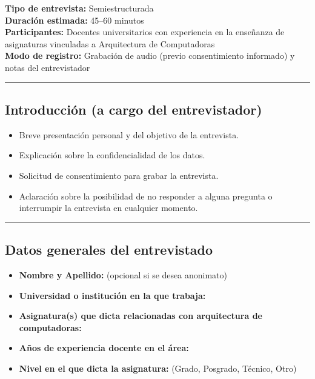 \documentclass[12pt,oneside]{templates/unerthesis}
\providecommand{\tightlist}{%
  \setlength{\itemsep}{0pt}\setlength{\parskip}{0pt}}
\begin{document}
\textbf{Tipo de entrevista:} Semiestructurada\\
\textbf{Duración estimada:} 45--60 minutos\\
\textbf{Participantes:} Docentes universitarios con experiencia en la enseñanza de asignaturas vinculadas a Arquitectura de Computadoras\\
\textbf{Modo de registro:} Grabación de audio (previo consentimiento informado) y notas del entrevistador

\begin{center}\rule{0.5\linewidth}{0.5pt}\end{center}

\hypertarget{introducciuxf3n-a-cargo-del-entrevistador}{%
\subsection{Introducción (a cargo del entrevistador)}\label{introducciuxf3n-a-cargo-del-entrevistador}}

\begin{itemize}
\tightlist
\item
  Breve presentación personal y del objetivo de la entrevista.
\item
  Explicación sobre la confidencialidad de los datos.
\item
  Solicitud de consentimiento para grabar la entrevista.
\item
  Aclaración sobre la posibilidad de no responder a alguna pregunta o interrumpir la entrevista en cualquier momento.
\end{itemize}

\begin{center}\rule{0.5\linewidth}{0.5pt}\end{center}

\hypertarget{datos-generales-del-entrevistado}{%
\subsection{Datos generales del entrevistado}\label{datos-generales-del-entrevistado}}

\begin{itemize}
\tightlist
\item
  \textbf{Nombre y Apellido:} (opcional si se desea anonimato)
\item
  \textbf{Universidad o institución en la que trabaja:}
\item
  \textbf{Asignatura(s) que dicta relacionadas con arquitectura de computadoras:}
\item
  \textbf{Años de experiencia docente en el área:}
\item
  \textbf{Nivel en el que dicta la asignatura:} (Grado, Posgrado, Técnico, Otro)
\end{itemize}
\end{document}
